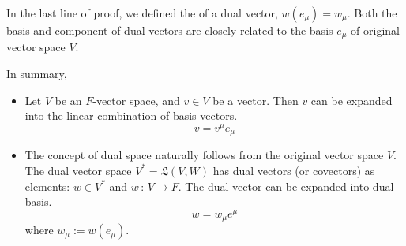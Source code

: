 \documentclass[a4paper, 10pt]{article}
\begin{document}

\begin{remark}
    In the last line of proof, we defined the  of a dual vector, $w(e_{\mu}) = w_{\mu}$. Both the basis and component of dual vectors are closely related to the basis $e_{\mu}$ of original vector space $V$.
\end{remark}

In summary,
\begin{itemize}
    \item[-] Let $V$ be an $F$-vector space, and $v \in V$ be a vector. Then $v$ can be expanded into the linear combination of basis vectors.
    \[ \boxed{v = v^{\mu} e_{\mu}} \]
    \item[-] The concept of dual space naturally follows from the original vector space $V$. The dual vector space $V^{\ast} = \mathfrak{L}(V,W)$ has dual vectors (or covectors) as elements: $w \in V^{\ast}$ and $w \,:\, V \rightarrow F$. The dual vector can be expanded into dual basis.
    \[ \boxed{w = w_{\mu} e^{\mu}} \]
    where $w_{\mu} := w(e_{\mu})$.
\end{itemize}
\end{document}
